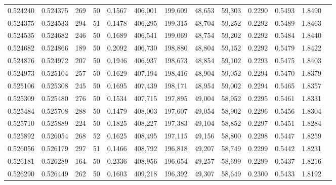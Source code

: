 \begin{tabular}{rrrrrrrrrrrrr}
0.524240 & 0.524375 &   269 &  50 &                                     0.1567 & 406,001 & 199,609 &  48,653 &  59,303 & 0.2290 & 0.5493 & 1.8490 \\
0.524375 & 0.524533 &   294 &  51 &                                     0.1478 & 406,295 & 199,315 &  48,704 &  59,252 & 0.2292 & 0.5489 & 1.8463 \\
0.524535 & 0.524682 &   246 &  50 &                                     0.1689 & 406,541 & 199,069 &  48,754 &  59,202 & 0.2292 & 0.5484 & 1.8440 \\
0.524682 & 0.524866 &   189 &  50 &                                     0.2092 & 406,730 & 198,880 &  48,804 &  59,152 & 0.2292 & 0.5479 & 1.8422 \\
0.524876 & 0.524972 &   207 &  50 &                                     0.1946 & 406,937 & 198,673 &  48,854 &  59,102 & 0.2293 & 0.5475 & 1.8403 \\
0.524973 & 0.525104 &   257 &  50 &                                     0.1629 & 407,194 & 198,416 &  48,904 &  59,052 & 0.2294 & 0.5470 & 1.8379 \\
0.525106 & 0.525308 &   245 &  50 &                                     0.1695 & 407,439 & 198,171 &  48,954 &  59,002 & 0.2294 & 0.5465 & 1.8357 \\
0.525309 & 0.525480 &   276 &  50 &                                     0.1534 & 407,715 & 197,895 &  49,004 &  58,952 & 0.2295 & 0.5461 & 1.8331 \\
0.525484 & 0.525708 &   288 &  50 &                                     0.1479 & 408,003 & 197,607 &  49,054 &  58,902 & 0.2296 & 0.5456 & 1.8304 \\
0.525710 & 0.525889 &   224 &  50 &                                     0.1825 & 408,227 & 197,383 &  49,104 &  58,852 & 0.2297 & 0.5451 & 1.8284 \\
0.525892 & 0.526054 &   268 &  52 &                                     0.1625 & 408,495 & 197,115 &  49,156 &  58,800 & 0.2298 & 0.5447 & 1.8259 \\
0.526056 & 0.526179 &   297 &  51 &                                     0.1466 & 408,792 & 196,818 &  49,207 &  58,749 & 0.2299 & 0.5442 & 1.8231 \\
0.526181 & 0.526289 &   164 &  50 &                                     0.2336 & 408,956 & 196,654 &  49,257 &  58,699 & 0.2299 & 0.5437 & 1.8216 \\
0.526290 & 0.526449 &   262 &  50 &                                     0.1603 & 409,218 & 196,392 &  49,307 &  58,649 & 0.2300 & 0.5433 & 1.8192 \\

\end{tabular}
